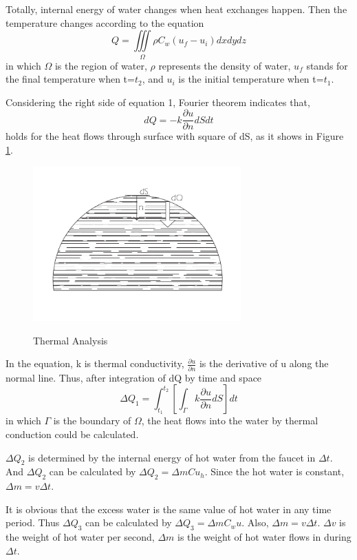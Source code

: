 \documentclass[12pt,a4paper,titlepage]{article}
\begin{document}
Totally, internal energy of water changes when heat exchanges happen.
Then the temperature changes according to the equation
\begin{equation}
 Q=\iiint\limits_{\Omega}\rho C_{w}(u_f - u_i)dx dy dz
\end{equation}
in which $\Omega$ is the region of water, $\rho$ represents the density of water, $u_f$ stands for the final temperature when t=$t_2$, and $u_i$ is the initial temperature when t=$t_1$.

Considering the right side of equation 1,
 Fourier theorem indicates that,
\begin{equation}
 dQ=-k\frac{\partial u}{\partial n}dSdt
\end{equation}
holds for the heat flows through surface with square of dS, as it shows in Figure \ref{2_p}.
\begin{figure}[htb]
  \centering
  \includegraphics[width=8cm]{1.pdf}\\
  \caption{Thermal Analysis}\label{2_p}
\end{figure}
In the equation, k is thermal conductivity, $\frac{\partial u}{\partial n}$ is the derivative of u along the normal line. Thus, after integration of dQ by time and space
\begin{equation}
 \Delta Q_1=\int_{t_1}^{t_2}[{\int_{\Gamma}}k\frac{\partial u}{\partial n}dS]dt
\end{equation}
in which $\Gamma$ is the boundary of $\Omega$,
the heat flows into the water by thermal conduction could be calculated.

$\Delta Q_2$ is determined by the internal energy of hot water from the faucet in $\Delta t$.
And $\Delta Q_2$ can be calculated by
$\Delta Q_2={\Delta m}C{u_h}$.
Since the hot water is constant,
$\Delta m=v{\Delta t}$.

It is obvious that the excess water is the same value of hot water in any time period.
Thus $\Delta Q_3$ can be calculated by
$\Delta Q_3={\Delta m}{C_w}u$.
Also, $\Delta m=v{\Delta t}$.
$\Delta v$ is the weight of hot water per second, $\Delta m$ is the weight of hot water flows in during $\Delta t$.
\end{document}
